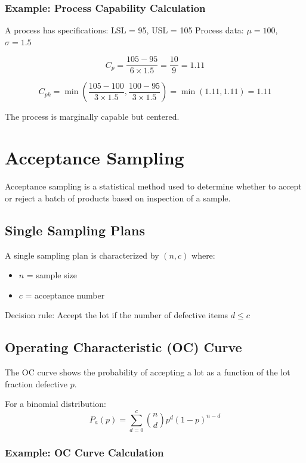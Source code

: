 \documentclass[twoside]{book}
\begin{document}
\subsubsection{Example: Process Capability Calculation}

A process has specifications: LSL = 95, USL = 105
Process data: $\mu = 100$, $\sigma = 1.5$

$$C_p = \frac{105 - 95}{6 \times 1.5} = \frac{10}{9} = 1.11$$

$$C_{pk} = \min\left(\frac{105 - 100}{3 \times 1.5}, \frac{100 - 95}{3 \times 1.5}\right) = \min(1.11, 1.11) = 1.11$$

The process is marginally capable but centered.

\section{Acceptance Sampling}

Acceptance sampling is a statistical method used to determine whether to accept or reject a batch of products based on inspection of a sample.

\subsection{Single Sampling Plans}

A single sampling plan is characterized by $(n, c)$ where:
\begin{itemize}
    \item $n$ = sample size
    \item $c$ = acceptance number
\end{itemize}

Decision rule: Accept the lot if the number of defective items $d \leq c$

\subsection{Operating Characteristic (OC) Curve}

The OC curve shows the probability of accepting a lot as a function of the lot fraction defective $p$.

For a binomial distribution:
$$P_a(p) = \sum_{d=0}^{c} \binom{n}{d} p^d (1-p)^{n-d}$$

\subsubsection{Example: OC Curve Calculation}
\end{document}
